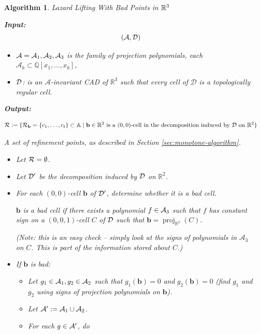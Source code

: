 \documentclass[
]{book}
\newtheorem{algorithm}{Algorithm}
\theoremstyle{definition}
\theoremstyle{definition}
\theoremstyle{definition}
\theoremstyle{definition}
\theoremstyle{remark}
\begin{document}
\begin{algorithm}Lazard Lifting With Bad Points in $\mathbb{R}^3$

\citep[Algorithm 5.15]{lazard10}

\textbf{Input:}
\[({\cal A}, {\cal D})\]

\begin{itemize}
\item
  \({\cal A} = {\cal A}_1,{\cal A}_2,{\cal A}_3\) is the family of projection polynomials, each \(\mathcal{A}_k \subset \mathbb{Q}[x_1,\ldots,x_k]\),
\item
  \(\cal D\): is an \(\mathcal{A}\)-invariant CAD of \(\mathbb{R}^3\) such that every cell of \(\mathcal{D}\) is a topologically regular cell.
\end{itemize}

\textbf{Output:}

\[
{\cal R} := \{ {\cal R}_{\mathbf{b}} = \{ c_1,\ldots,c_t \} \subset \mathbb{A}\mid \mathbf{b} \in \mathbb{R}^{2} \text{ is a } (0,0) \text{-cell in the decomposition induced by } {\cal D} \text{ on } \mathbb{R}^2 \}
\]

A set of refinement points, as described in Section \ref{sec:monotone-algorithm}.

\begin{itemize}
\item
  Let \({\cal R} = \emptyset\).
\item
  Let \(\cal D'\) be the decomposition induced by \(\cal D\) on \(\mathbb{R}^2\).
\item
  For each \((0,0)\)-cell \(\mathbf{b}\) of \(\cal D'\), determine whether it is a bad cell.

  \(\mathbf{b}\) is a bad cell if there exists a polynomial \(f \in {\cal A}_3\) such that \(f\) has constant sign on a \((0,0,1)\)-cell \(C\) of \(\cal D\) such that \(\mathbf{b} = {\operatorname{proj}_{\mathbb{R}^{2}}}(C)\).

  (Note: this is an easy check -- simply look at the signs of polynomials in \(\mathcal{A}_3\) on \(C\). This is part of the information stored about \(C\).)
\item
  If \(\mathbf{b}\) is bad:

  \begin{itemize}
  \item
    Let \(g_1 \in {\cal A}_1, g_2 \in {\cal A}_2\) such that \(g_1(\mathbf{b}) = 0\) and \(g_2(\mathbf{b}) = 0\) (find \(g_1\) and \(g_2\) using signs of projection polynomials on \(\mathbf{b}\)).
  \item
    Let \({\cal A'} := {\cal A}_1 \cup {\cal A}_2\).
  \item
    For each \(g \in {\cal A'}\), do


\end{itemize}
\end{itemize}
\end{algorithm}
\end{document}
